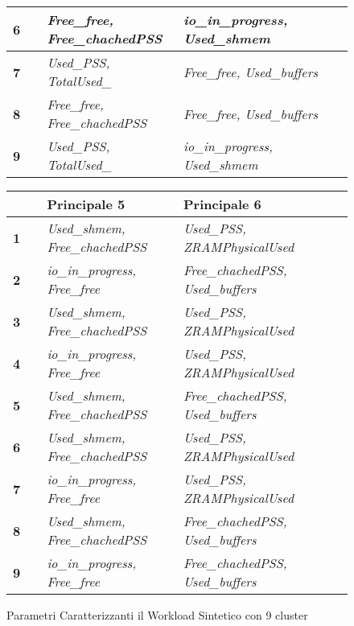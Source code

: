 \begin{figure}
\begin{tabular}{p{0.1\linewidth} || p{0.4\linewidth} | p{0.55\linewidth}}
    \hline
    \textbf{6} & \textit{Free\_free, Free\_chachedPSS} & \textit{io\_in\_progress, Used\_shmem} \\
    \hline
    \textbf{7} & \textit{Used\_PSS, TotalUsed\_}  & \textit{Free\_free, Used\_buffers} \\
    \hline
    \textbf{8} & \textit{Free\_free, Free\_chachedPSS} & \textit{Free\_free, Used\_buffers} \\
    \hline
    \textbf{9} & \textit{Used\_PSS, TotalUsed\_} & \textit{io\_in\_progress, Used\_shmem} \\
    \hline
  \end{tabular}
  \begin{tabular}{p{0.1\linewidth} || p{0.4\linewidth} | p{0.55\linewidth}}
    & \textbf{Principale 5} & \textbf{Principale 6}  \\
   \hline
   \hline
   \textbf{1} & \textit{Used\_shmem, Free\_chachedPSS} & \textit{Used\_PSS, ZRAMPhysicalUsed} \\
   \hline
   \textbf{2} & \textit{io\_in\_progress, Free\_free} & \textit{Free\_chachedPSS, Used\_buffers} \\
   \hline
   \textbf{3} & \textit{Used\_shmem, Free\_chachedPSS} & \textit{Used\_PSS, ZRAMPhysicalUsed} \\
   \hline
   \textbf{4} & \textit{io\_in\_progress, Free\_free} & \textit{Used\_PSS, ZRAMPhysicalUsed} \\
   \hline
   \textbf{5} & \textit{Used\_shmem, Free\_chachedPSS} & \textit{Free\_chachedPSS, Used\_buffers} \\
   \hline
   \textbf{6} & \textit{Used\_shmem, Free\_chachedPSS} & \textit{Used\_PSS, ZRAMPhysicalUsed} \\
   \hline
   \textbf{7} & \textit{io\_in\_progress, Free\_free} & \textit{Used\_PSS, ZRAMPhysicalUsed} \\
   \hline
   \textbf{8} & \textit{Used\_shmem, Free\_chachedPSS} & \textit{Free\_chachedPSS, Used\_buffers} \\
   \hline
   \textbf{9} & \textit{io\_in\_progress, Free\_free} & \textit{Free\_chachedPSS, Used\_buffers} \\
   \hline
  \end{tabular}
  \caption{Parametri Caratterizzanti il Workload Sintetico con 9 cluster}
  \end{figure}
